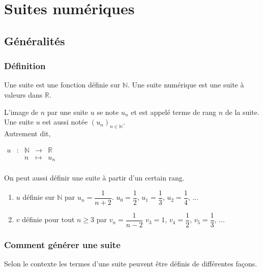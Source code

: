 \documentclass[french]{book}
\newcommand{\R}{\mathbb {R}}
\newcommand{\N}{\mathbb {N}}
\newcommand{\se}{\geq}
\newcommand{\suite}[1][u]{\left( #1_{n} \right)_{n\in\N}}
\begin{document}
\tableofcontents
\setcounter{chapter}{1}
\chapter{Suites numériques}

\section{Généralités}
\subsection{Définition}
\begin{defn}
Une suite est une fonction définie sur $\N$. Une suite numérique est une suite à valeurs dans $\R$.

 L'image de $n$ par une suite $u$ se note $u_{n}$ et est appelé terme de rang $n$ de la suite. Une suite $u$ est aussi notée $\suite[u]$.\\
 
Autrement dit, 
\begin{center}
$\begin{array}{ccccc}
u & : & \mathbb{N} & \to & \mathbb{R} \\
 & & n & \mapsto & u_n\\
\end{array}$
\end{center}
\end{defn}

\begin{rem}
On peut aussi définir une suite à partir d'un certain rang.
\end{rem}

\begin{exemple}
\begin{enumerate}
\item $u$ définie sur $\N$ par $u_{n}=\dfrac{1}{n+2}$.
\hspace{2em} $u_0=\dfrac{1}{2}$, $u_1=\dfrac{1}{3}$, $u_2=\dfrac{1}{4}$, ...
\item $v$ définie pour tout $n\se3$ par $v_{n}=\dfrac{1}{n-2}$
\hspace{2em} $v_3=1$, $v_4=\dfrac{1}{2}$, $v_5=\dfrac{1}{3}$, ...
\end{enumerate}
\end{exemple}


\subsection{Comment générer une suite}
Selon le contexte les termes d'une suite peuvent être définis de différentes façons.
\end{document}
